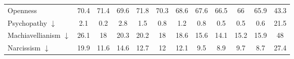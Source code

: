 \begin{table}[ht]
\begin{tabular}{l|ccccc|ccccc|c}
Openness & \cellcolor{royalblue!86} 70.4 & \cellcolor{royalblue!89} 71.4 & \cellcolor{royalblue!83} 69.6 & \cellcolor{royalblue!90} 71.8 & \cellcolor{royalblue!85} 70.3 & \cellcolor{royalblue!80} 68.6 & \cellcolor{royalblue!77} 67.6 & \cellcolor{royalblue!73} 66.5 & \cellcolor{royalblue!72} 66 & \cellcolor{royalblue!71} 65.9 & 43.3 \\
Psychopathy $\downarrow$ & \cellcolor{royalblue!82} 2.1 & \cellcolor{royalblue!90} 0.2 & \cellcolor{royalblue!79} 2.8 & \cellcolor{royalblue!85} 1.5 & \cellcolor{royalblue!87} 0.8 & \cellcolor{royalblue!86} 1.2 & \cellcolor{royalblue!87} 0.8 & \cellcolor{royalblue!89} 0.5 & \cellcolor{royalblue!89} 0.5 & \cellcolor{royalblue!88} 0.6 & 21.5 \\
Machiavellianism $\downarrow$ & \cellcolor{royalblue!58} 26.1 & \cellcolor{royalblue!80} 18 & \cellcolor{royalblue!74} 20.3 & \cellcolor{royalblue!74} 20.2 & \cellcolor{royalblue!80} 18 & \cellcolor{royalblue!78} 18.6 & \cellcolor{royalblue!86} 15.6 & \cellcolor{royalblue!90} 14.1 & \cellcolor{royalblue!87} 15.2 & \cellcolor{royalblue!85} 15.9 & 48 \\
Narcissism $\downarrow$ & \cellcolor{royalblue!36} 19.9 & \cellcolor{royalblue!76} 11.6 & \cellcolor{royalblue!62} 14.6 & \cellcolor{royalblue!71} 12.7 & \cellcolor{royalblue!74} 12 & \cellcolor{royalblue!74} 12.1 & \cellcolor{royalblue!86} 9.5 & \cellcolor{royalblue!89} 8.9 & \cellcolor{royalblue!85} 9.7 & \cellcolor{royalblue!90} 8.7 & 27.4 \\
\bottomrule
\end{tabular}
\end{table}